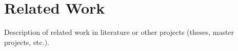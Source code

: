 \section{Related Work}
\label{sec:related-work}

Description of related work in literature or other projects (theses, master projects, etc.).